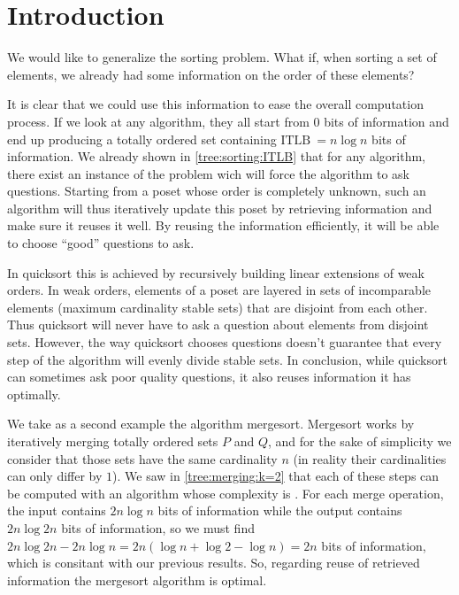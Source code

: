 
\section{Introduction}


We would like to generalize the sorting problem. What if, when sorting a set of elements, we already had some information on the order of these elements?


It is clear that we could use this information to ease the overall computation process. If we look at any  algorithm, they all start from $0$ bits of information and end up producing a totally ordered set containing $\text{ITLB}~= n \log n$ bits of information. We already shown in \ref{tree:sorting:ITLB} that for any algorithm, there exist an instance of the problem wich will force the algorithm to ask  questions. Starting from a poset whose order is completely unknown, such an algorithm will thus iteratively update this poset by retrieving information and make sure it reuses it well. By reusing the information efficiently, it will be able to choose ``good'' questions to ask.


In quicksort this is achieved by recursively building linear extensions of weak orders. In weak orders, elements of a poset are layered in sets of incomparable elements (maximum cardinality stable sets) that are disjoint from each other. Thus quicksort will never have to ask a question about elements from disjoint sets. However, the way quicksort chooses questions doesn't guarantee that every step of the algorithm will evenly divide stable sets. In conclusion, while quicksort can sometimes ask poor quality questions, it also reuses information it has optimally.


We take as a second example the algorithm mergesort. Mergesort works by iteratively merging totally ordered sets $P$ and $Q$, and for the sake of simplicity we consider that those sets have the same cardinality $n$  (in reality their cardinalities can only differ by $1$). We saw in \ref{tree:merging:k=2} that each of these steps can be computed with an algorithm whose complexity is . For each merge operation, the input contains $2n \log n$ bits of information while the output contains $2n \log 2n$ bits of information, so we must find $2n \log 2n - 2n \log n = 2n (\log n + \log 2 - \log n) = 2n$ bits of information, which is consitant with our previous results. So, regarding reuse of retrieved information the mergesort algorithm is optimal.

